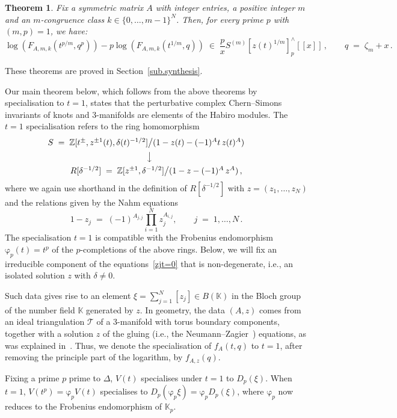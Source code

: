 \documentclass[12pt,reqno]{amsart}
\newcounter{theoremcount}
\newtheorem{theorem}[theoremcount]{Theorem}
\theoremstyle{definition}
\def\BZ{\mathbb Z}
\def\BK{\mathbb K}
\def\calT{\mathcal T}
\def\be{\begin{equation}}
\def\ee{\end{equation}}
\def\z{\zeta}
\def\={\;=\;}
\def\inn{\;\in\;}
\def\fr{\mathrm{\varphi}_p}
\def\Phitof{f}
\begin{document}
\begin{theorem}
\label{thm.FGI2}
Fix a symmetric matrix $A$ with integer entries, a positive integer $m$ and
an $m$-congruence class $k \in\{0,\dots,m-1\}^N$. Then, for every prime $p$ with
$(m,p)=1$, we have:
\be
\label{dphiA}
\log(F_{A,m,k}(t^{p/m},q^p))
-p\log(F_{A,m,k}(t^{1/m},q))
\inn \frac{p}{x} S^{(m)}[z(t)^{1/m}]^{\wedge}_p [\![x]\!]\,,\qquad
q\=\z_{m}+x \,.
\ee
\end{theorem}

These theorems are proved in Section~\ref{sub.synthesis}.

Our main theorem below, which follows from the above theorems by specialisation
to $t=1$, states that the perturbative complex Chern--Simons invariants of knots
and 3-manifolds are elements of the Habiro modules. The $t=1$ specialisation refers
to the ring homomorphism
\be
\begin{array}{c}
S \= \BZ[t^{\pm}, z^{\pm 1}(t), \delta(t)^{-1/2}]
\big/(1-z(t)-(-1)^A t \,z(t)^A)_{\phantom{2}_{\phantom{2}_{\phantom{2}_{
\phantom{2}_{\phantom{2}_{\phantom{2}}}}}}}\\
\big\downarrow_{\phantom{2}_{\phantom{2}_{\phantom{2}_{\phantom{2}}}}}\\
R[\delta^{-1/2}] \= \BZ[z^{\pm 1}, \delta^{-1/2}]\big/(1-z-(-1)^A \,z^A)\,,
\end{array}
\ee
where we again use shorthand in the definition of $R[\delta^{-1/2}]$ with
$z=(z_1,\dots,z_N)$ and the relations given by the Nahm equations
\be
\label{zjt=0}
1-z_j \= (-1)^{A_{j,j}} \prod_{i=1}^N z_j^{A_{i,j}},
\qquad j\=1,\dots,N \,.
\ee
The specialisation $t=1$ is compatible with the Frobenius endomorphism $\fr(t)=t^p$
of the $p$-completions of the above rings. Below, we will fix an irreducible
component of the equations~\eqref{zjt=0} that is non-degenerate, i.e., an isolated
solution $z$ with $\delta \neq 0$.

Such data gives rise to an element
$\xi=\sum_{j=1}^N [z_j] \in B(\BK)$ in the Bloch group of the number field $\BK$
generated by $z$. In geometry, the data $(A,z)$ comes from an ideal triangulation
$\calT$ of a 3-manifold with torus boundary components, together with a solution
$z$ of the gluing (i.e., the Neumann--Zagier~\cite{NZ}) equations, as was explained
in~\cite{DG}. Thus, we denote the specialisation of $\Phitof_{A}(t,q)$ to $t=1$, after
removing the principle part of the logarithm, by $\Phitof_{A,z}(q)$.

Fixing a prime $p$ prime to $\Delta$, $V(t)$ specialises under $t=1$ to $D_p(\xi)$.
When $t=1$, $V(t^p)=\fr V(t)$ specialises
to $D_p(\fr \xi) = \fr D_p(\xi)$, where $\fr$ now reduces to the Frobenius
endomorphism of $\BK_p$.
\end{document}
